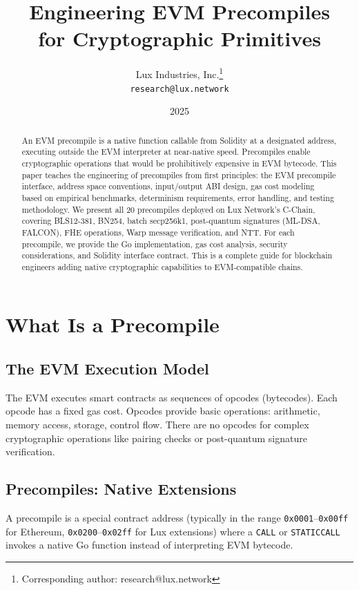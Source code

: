 \documentclass[11pt,a4paper]{article}
\title{Engineering EVM Precompiles\\for Cryptographic Primitives}
\author{
Lux Industries, Inc.\thanks{Corresponding author: research@lux.network}\\
\texttt{research@lux.network}
}
\date{2025}
\begin{document}
\luxcoverpage

\begin{abstract}
An EVM precompile is a native function callable from Solidity at a designated address,
executing outside the EVM interpreter at near-native speed. Precompiles enable
cryptographic operations that would be prohibitively expensive in EVM bytecode. This paper
teaches the engineering of precompiles from first principles: the EVM precompile interface,
address space conventions, input/output ABI design, gas cost modeling based on empirical
benchmarks, determinism requirements, error handling, and testing methodology. We present
all 20 precompiles deployed on Lux Network's C-Chain, covering BLS12-381, BN254, batch
secp256k1, post-quantum signatures (ML-DSA, FALCON), FHE operations, Warp message
verification, and NTT. For each precompile, we provide the Go implementation, gas cost
analysis, security considerations, and Solidity interface contract. This is a complete
guide for blockchain engineers adding native cryptographic capabilities to EVM-compatible
chains.
\end{abstract}

\tableofcontents
\newpage

\section{What Is a Precompile}

\subsection{The EVM Execution Model}

The EVM executes smart contracts as sequences of opcodes (bytecodes). Each opcode has a
fixed gas cost. Opcodes provide basic operations: arithmetic, memory access, storage,
control flow. There are no opcodes for complex cryptographic operations like pairing
checks or post-quantum signature verification.

\subsection{Precompiles: Native Extensions}

A precompile is a special contract address (typically in the range \texttt{0x0001}--\texttt{0x00ff}
for Ethereum, \texttt{0x0200}--\texttt{0x02ff} for Lux extensions) where a \texttt{CALL}
or \texttt{STATICCALL} invokes a native Go function instead of interpreting EVM bytecode.
\end{document}
